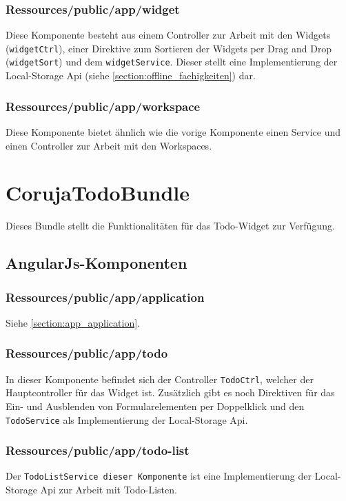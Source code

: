 \subsubsection*{Ressources/public/app/widget}
Diese Komponente besteht aus einem Controller zur Arbeit mit den Widgets (\texttt{widgetCtrl}), einer Direktive zum Sortieren der Widgets per Drag and Drop (\texttt{widgetSort}) und dem \texttt{widgetService}. Dieser stellt eine Implementierung der Local-Storage Api (siehe \ref{section:offline_faehigkeiten}) dar.

\subsubsection*{Ressources/public/app/workspace}
Diese Komponente bietet ähnlich wie die vorige Komponente einen Service und einen Controller zur Arbeit mit den Workspaces.

\section{CorujaTodoBundle}
Dieses Bundle stellt die Funktionalitäten für das Todo-Widget zur Verfügung.

\subsection{AngularJs-Komponenten}

\subsubsection*{Ressources/public/app/application}
Siehe \ref{section:app_application}.

\subsubsection*{Ressources/public/app/todo}
In dieser Komponente befindet sich der Controller \texttt{TodoCtrl}, welcher der Hauptcontroller für das Widget ist. Zusätzlich gibt es noch Direktiven für das Ein- und Ausblenden von Formularelementen per Doppelklick und den \texttt{TodoService} als Implementierung der Local-Storage Api.

\subsubsection*{Ressources/public/app/todo-list}
Der \texttt{TodoListService dieser Komponente} ist eine Implementierung der Local-Storage Api zur Arbeit mit Todo-Listen.
